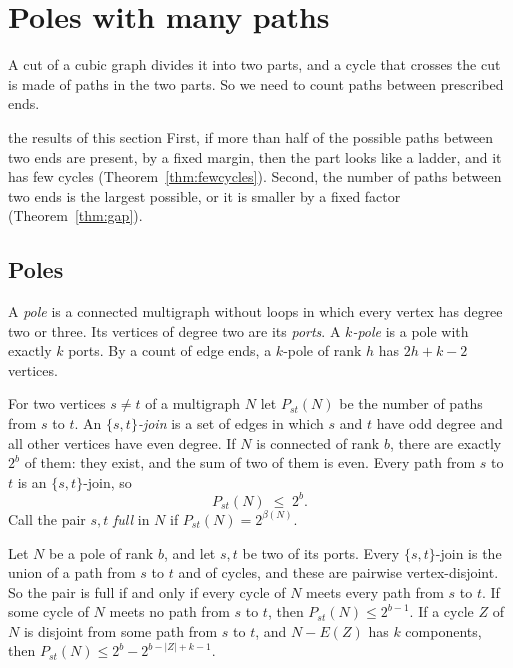 \section{Poles with many paths}\label{sec:poles}

A cut of a cubic graph divides it into two parts, and a cycle that crosses the cut is made of
paths in the two parts. So we need to count paths between prescribed ends.

\begin{idea}{the results of this section}
First, if more than half of the possible paths between two ends are present, by a fixed margin,
then the part looks like a ladder, and it has few cycles (Theorem~\ref{thm:fewcycles}). Second,
the number of paths between two ends is the largest possible, or it is smaller by a fixed factor
(Theorem~\ref{thm:gap}).
\end{idea}

\subsection{Poles}

A \emph{pole} is a connected multigraph without loops in which every vertex has degree two or
three. Its vertices of degree two are its \emph{ports}. A \emph{$k$-pole} is a pole with exactly
$k$ ports. By a count of edge ends, a $k$-pole of rank $h$ has $2h+k-2$ vertices.

For two vertices $s\ne t$ of a multigraph $N$ let $P_{st}(N)$ be the number of paths from $s$ to
$t$. An \emph{$\{s,t\}$-join} is a set of edges in which $s$ and $t$ have odd degree and all other
vertices have even degree. If $N$ is connected of rank $b$, there are exactly $2^{b}$ of them: they
exist, and the sum of two of them is even. Every path from $s$ to $t$ is an $\{s,t\}$-join, so
\begin{equation}\label{eq:joinbound}
  P_{st}(N)\;\le\;2^{b}.
\end{equation}
Call the pair $s,t$ \emph{full} in $N$ if $P_{st}(N)=2^{\beta(N)}$.

\begin{lemma}[Joins]\label{lem:joins}
Let $N$ be a pole of rank $b$, and let $s,t$ be two of its ports. Every $\{s,t\}$-join is the union
of a path from $s$ to $t$ and of cycles, and these are pairwise vertex-disjoint. So the pair is
full if and only if every cycle of $N$ meets every path from $s$ to $t$. If some cycle of $N$ meets
no path from $s$ to $t$, then $P_{st}(N)\le2^{b-1}$. If a cycle $Z$ of $N$ is disjoint from some
path from $s$ to $t$, and $N-E(Z)$ has $k$ components, then $P_{st}(N)\le2^{b}-2^{b-|Z|+k-1}$.
\end{lemma}

